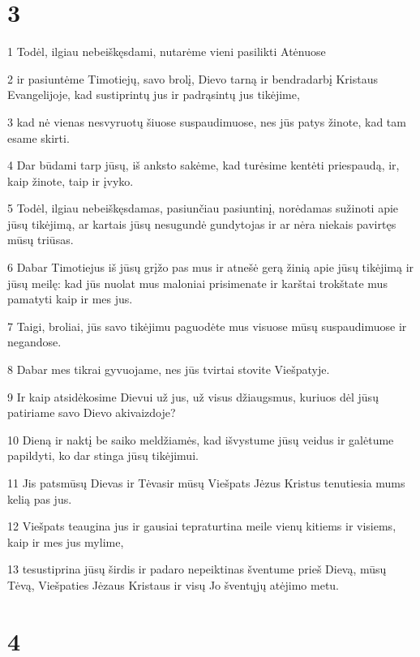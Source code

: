\chapter{3}


\par 1 Todėl, ilgiau nebeiškęsdami, nutarėme vieni pasilikti Atėnuose 
\par 2 ir pasiuntėme Timotiejų, savo brolį, Dievo tarną ir bendradarbį Kristaus Evangelijoje, kad sustiprintų jus ir padrąsintų jus tikėjime, 
\par 3 kad nė vienas nesvyruotų šiuose suspaudimuose, nes jūs patys žinote, kad tam esame skirti. 
\par 4 Dar būdami tarp jūsų, iš anksto sakėme, kad turėsime kentėti priespaudą, ir, kaip žinote, taip ir įvyko. 
\par 5 Todėl, ilgiau nebeiškęsdamas, pasiunčiau pasiuntinį, norėdamas sužinoti apie jūsų tikėjimą, ar kartais jūsų nesugundė gundytojas ir ar nėra niekais pavirtęs mūsų triūsas. 
\par 6 Dabar Timotiejus iš jūsų grįžo pas mus ir atnešė gerą žinią apie jūsų tikėjimą ir jūsų meilę: kad jūs nuolat mus maloniai prisimenate ir karštai trokštate mus pamatyti kaip ir mes jus. 
\par 7 Taigi, broliai, jūs savo tikėjimu paguodėte mus visuose mūsų suspaudimuose ir negandose. 
\par 8 Dabar mes tikrai gyvuojame, nes jūs tvirtai stovite Viešpatyje. 
\par 9 Ir kaip atsidėkosime Dievui už jus, už visus džiaugsmus, kuriuos dėl jūsų patiriame savo Dievo akivaizdoje? 
\par 10 Dieną ir naktį be saiko meldžiamės, kad išvystume jūsų veidus ir galėtume papildyti, ko dar stinga jūsų tikėjimui. 
\par 11 Jis pats­mūsų Dievas ir Tėvas­ir mūsų Viešpats Jėzus Kristus tenutiesia mums kelią pas jus. 
\par 12 Viešpats teaugina jus ir gausiai tepraturtina meile vienų kitiems ir visiems, kaip ir mes jus mylime,­ 
\par 13 tesustiprina jūsų širdis ir padaro nepeiktinas šventume prieš Dievą, mūsų Tėvą, Viešpaties Jėzaus Kristaus ir visų Jo šventųjų atėjimo metu.


\chapter{4}



